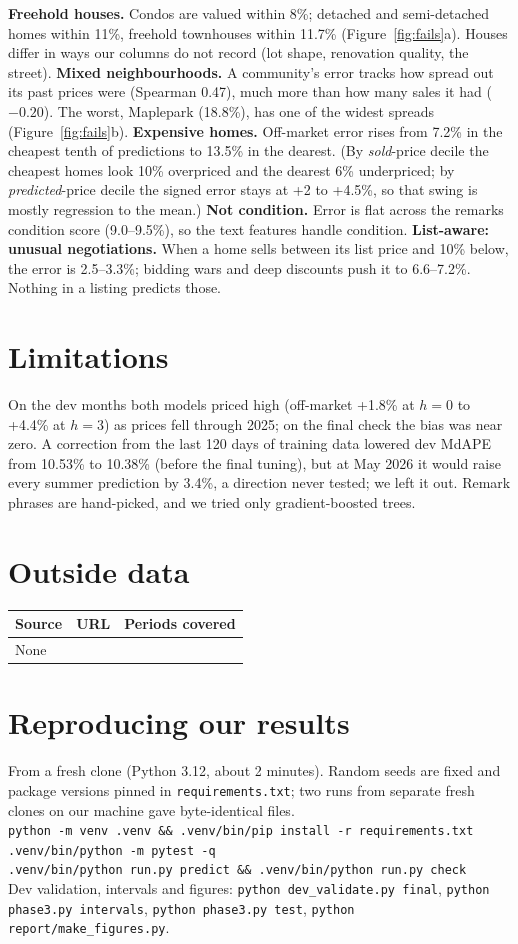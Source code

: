 \documentclass[11pt]{article}
\begin{document}
\textbf{Freehold houses.} Condos are valued within 8\%; detached and semi-detached homes within 11\%,
freehold townhouses within 11.7\% (Figure~\ref{fig:fails}a). Houses differ in ways our columns do not
record (lot shape, renovation quality, the street).
\textbf{Mixed neighbourhoods.} A community's error tracks how spread out its past prices were
(Spearman 0.47), much more than how many sales it had ($-0.20$). The worst, Maplepark (18.8\%), has one
of the widest spreads (Figure~\ref{fig:fails}b).
\textbf{Expensive homes.} Off-market error rises from 7.2\% in the cheapest tenth of predictions to
13.5\% in the dearest. (By \emph{sold}-price decile the cheapest homes look 10\% overpriced and the dearest 6\%
underpriced; by \emph{predicted}-price decile the signed error stays at +2 to +4.5\%, so that swing is
mostly regression to the mean.)
\textbf{Not condition.} Error is flat across the remarks condition score (9.0--9.5\%), so the text
features handle condition.
\textbf{List-aware: unusual negotiations.} When a home sells between its list price and 10\% below,
the error is 2.5--3.3\%; bidding wars and deep discounts push it to 6.6--7.2\%. Nothing in a listing
predicts those.

\section{Limitations}
On the dev months both models priced high (off-market +1.8\% at $h{=}0$ to +4.4\% at $h{=}3$) as
prices fell through 2025; on the final check the bias was near zero. A correction from the last
120 days of training data lowered dev MdAPE from 10.53\% to 10.38\% (before the final tuning), but at
May 2026 it would raise every summer prediction by 3.4\%, a direction never tested; we left it out.
Remark phrases are hand-picked, and we tried only gradient-boosted trees.

\section*{Outside data}
\begin{tabular}{lll}
\toprule
Source & URL & Periods covered \\
\midrule
None & & \\
\bottomrule
\end{tabular}

\section*{Reproducing our results}
From a fresh clone (Python 3.12, about 2 minutes). Random seeds are fixed and package versions pinned
in \texttt{requirements.txt}; two runs from separate fresh clones on our machine gave byte-identical files.\\
\texttt{python -m venv .venv \&\& .venv/bin/pip install -r requirements.txt}\\
\texttt{.venv/bin/python -m pytest -q}\\
\texttt{.venv/bin/python run.py predict \&\& .venv/bin/python run.py check}\\
Dev validation, intervals and figures: \texttt{python dev\_validate.py final},
\texttt{python phase3.py intervals}, \texttt{python phase3.py test}, \texttt{python report/make\_figures.py}.
\end{document}
